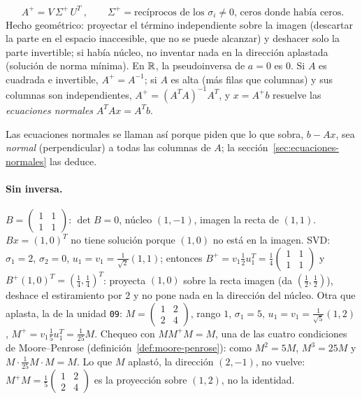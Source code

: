 \begin{resultado}
\[
  \boxed{\ A^{+}=V\,\Sigma^{+}\,U^T\ },\qquad
  \Sigma^{+}=\text{recíprocos de los }\sigma_i\neq0\text{, ceros donde había ceros}.
\]
Hecho geométrico: proyectar el término independiente sobre la imagen (descartar la parte
en el espacio inaccesible, que no se puede alcanzar) y deshacer solo la parte invertible;
si había núcleo, no inventar nada en la dirección aplastada (solución de norma mínima).
En \(\mathbb{R}\), la pseudoinversa de \(a=0\) es \(0\). Si \(A\) es cuadrada e invertible,
\(A^{+}=A^{-1}\); si \(A\) es alta (más filas que columnas) y sus columnas son
independientes, \(A^{+}=(A^TA)^{-1}A^T\), y \(x=A^{+}b\) resuelve las \emph{ecuaciones
normales} \(A^TAx=A^Tb\).
\end{resultado}

Las ecuaciones normales se llaman así porque piden que lo que sobra, \(b-Ax\), sea
\emph{normal} (perpendicular) a todas las columnas de \(A\); la
sección~\ref{sec:ecuaciones-normales} las deduce.

\paragraph{Sin inversa.} \(B=\begin{pmatrix}1&1\\1&1\end{pmatrix}\): \(\det B=0\), núcleo
\((1,-1)\), imagen la recta de \((1,1)\). \(Bx=(1,0)^T\) no tiene solución porque \((1,0)\)
no está en la imagen. SVD: \(\sigma_1=2\), \(\sigma_2=0\), \(u_1=v_1=\tfrac1{\sqrt2}(1,1)\);
entonces \(B^{+}=v_1\tfrac12u_1^T=\tfrac14\begin{pmatrix}1&1\\1&1\end{pmatrix}\) y
\(B^{+}(1,0)^T=(\tfrac14,\tfrac14)^T\): proyecta \((1,0)\) sobre la recta imagen (da
\((\tfrac12,\tfrac12)\)), deshace el estiramiento por \(2\) y no pone nada en la dirección
del núcleo. Otra que aplasta, la de la unidad \texttt{09}:
\(M=\begin{pmatrix}1&2\\2&4\end{pmatrix}\), rango \(1\), \(\sigma_1=5\),
\(u_1=v_1=\tfrac1{\sqrt5}(1,2)\), \(M^{+}=v_1\tfrac15u_1^T=\tfrac1{25}M\). Chequeo con
\(MM^{+}M=M\), una de las cuatro condiciones de Moore--Penrose
(definición~\ref{def:moore-penrose}): como \(M^2=5M\), \(M^3=25M\) y
\(M\cdot\tfrac1{25}M\cdot M=M\). Lo que \(M\) aplastó, la dirección \((2,-1)\), no vuelve:
\(M^{+}M=\tfrac15\begin{pmatrix}1&2\\2&4\end{pmatrix}\) es la proyección sobre \((1,2)\),
no la identidad.

